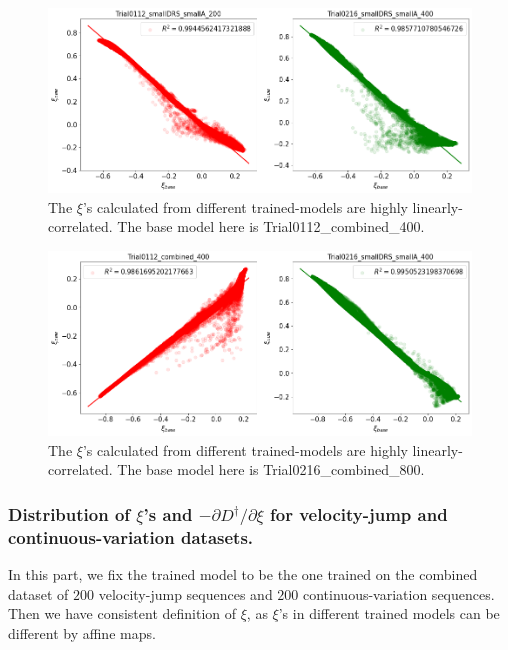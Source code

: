 \begin{figure}[H]
    \centering
    \includegraphics[width=1.0\textwidth]{images/LinReg_Xis.png}
    \caption{The $\xi$'s calculated from different trained-models are highly linearly-correlated. 
    The base model here is Trial0112_combined_400.}
    \label{fig:LinRegXis}
\end{figure}
\begin{figure}[H]
    \centering
    \includegraphics[width=1.0\textwidth]{images/LinReg_Xis_400_on_800.png}
    \caption{The $\xi$'s calculated from different trained-models are highly linearly-correlated. 
    The base model here is Trial0216_combined_800.}
    \label{fig:LinRegXis400On800}
\end{figure}

\subsubsection{Distribution of $\xi$'s and $-\partial D^\dagger / \partial \xi$ for velocity-jump and continuous-variation datasets.}
In this part, 
we fix the trained model to be the one trained on the combined dataset of $200$ velocity-jump sequences and $200$ continuous-variation sequences. 
Then we have consistent definition of $\xi$, 
as $\xi$'s in different trained models can be different by affine maps. 

